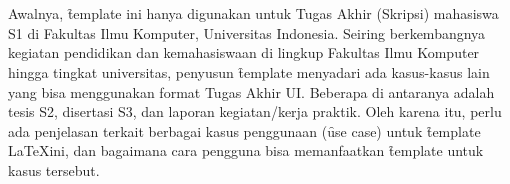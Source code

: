 \chapter{\babLima}
\label{bab:5}
Awalnya, \f{template} ini hanya digunakan untuk Tugas Akhir (Skripsi) mahasiswa S1 di Fakultas Ilmu Komputer, Universitas Indonesia. Seiring berkembangnya kegiatan pendidikan dan kemahasiswaan di lingkup Fakultas Ilmu Komputer hingga tingkat universitas, penyusun \f{template} menyadari ada kasus-kasus lain yang bisa menggunakan format Tugas Akhir UI. Beberapa di antaranya adalah tesis S2, disertasi S3, dan laporan kegiatan/kerja praktik. Oleh karena itu, perlu ada penjelasan terkait berbagai kasus penggunaan (\f{use case}) untuk \f{template} \LaTeX ini, dan bagaimana cara pengguna bisa memanfaatkan \f{template} untuk kasus tersebut.



